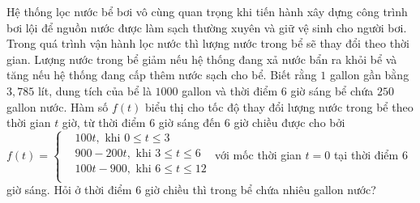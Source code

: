\begin{ex}%
Hệ thống lọc nước bể bơi vô cùng quan trọng khi tiến hành xây dựng công trình bơi lội để nguồn nước được làm sạch thường xuyên và giữ vệ sinh cho người bơi. Trong quá trình vận hành lọc nước thì lượng nước trong bể sẽ thay đổi theo thời gian. Lượng nước trong bể giảm nếu hệ thống đang xả nước bẩn ra khỏi bể và tăng nếu hệ thống đang cấp thêm nước sạch cho bể. Biết rằng $1$ gallon gần bằng $3,785$ lít, dung tích của bể là $ 1000$ gallon và thời điểm $6$ giờ sáng bể chứa $ 250$ gallon nước. Hàm số $ f(t)$ biểu thị cho tốc độ thay đổi lượng nước trong bể theo thời gian $ t$ giờ, từ thời điểm $6$ giờ sáng đến $6$ giờ chiều được cho bởi $f(t)=\left\{\begin{aligned}
& 100t, \text{ khi }0\le t\le 3\\ 
& 900-200t, \text{ khi }3\le t\le 6\\ 
& 100t-900, \text{ khi }6\le t\le 12\\ 
\end{aligned}\right.$ với mốc thời gian $ t=0$ tại thời điểm $6$ giờ sáng. Hỏi ở thời điểm $6$ giờ chiều thì trong bể chứa nhiêu gallon nước?
\end{ex}

